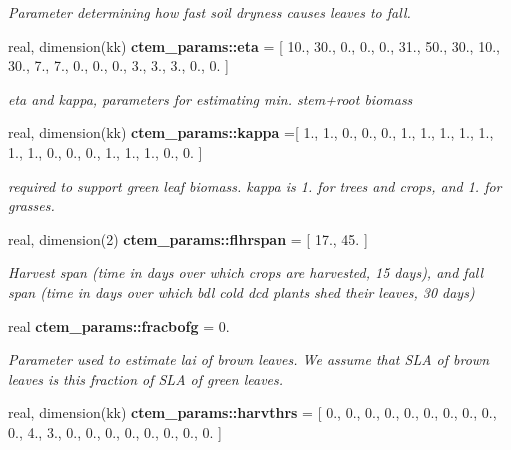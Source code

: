 \begin{DoxyCompactItemize}
\begin{DoxyCompactList}\small\item\em Parameter determining how fast soil dryness causes leaves to fall. \end{DoxyCompactList}\item 
\hypertarget{namespacectem__params_af316f76bee6244c68e937ed9e399bbd0}{}real, dimension(kk) {\bfseries ctem\+\_\+params\+::eta} = \mbox{[} 10., 30., 0., 0., 0., 31., 50., 30., 10., 30., 7., 7., 0., 0., 0., 3., 3., 3., 0., 0. \mbox{]}\label{namespacectem__params_af316f76bee6244c68e937ed9e399bbd0}

\begin{DoxyCompactList}\small\item\em eta and kappa, parameters for estimating min. stem+root biomass \end{DoxyCompactList}\item 
\hypertarget{namespacectem__params_a31cd33c14ab64d6e347e8fa8649c0ac8}{}real, dimension(kk) {\bfseries ctem\+\_\+params\+::kappa} =\mbox{[} 1., 1., 0., 0., 0., 1., 1., 1., 1., 1., 1., 1., 0., 0., 0., 1., 1., 1., 0., 0. \mbox{]}\label{namespacectem__params_a31cd33c14ab64d6e347e8fa8649c0ac8}

\begin{DoxyCompactList}\small\item\em required to support green leaf biomass. kappa is 1. for trees and crops, and 1. for grasses. \end{DoxyCompactList}\item 
\hypertarget{namespacectem__params_a766b351a6a0cf14bfa75068e43a300da}{}real, dimension(2) {\bfseries ctem\+\_\+params\+::flhrspan} = \mbox{[} 17., 45. \mbox{]}\label{namespacectem__params_a766b351a6a0cf14bfa75068e43a300da}

\begin{DoxyCompactList}\small\item\em Harvest span (time in days over which crops are harvested, 15 days), and fall span (time in days over which bdl cold dcd plants shed their leaves, 30 days) \end{DoxyCompactList}\item 
\hypertarget{namespacectem__params_a220bfc3b9a9be5d41edb3eda82a2988e}{}real {\bfseries ctem\+\_\+params\+::fracbofg} = 0.\label{namespacectem__params_a220bfc3b9a9be5d41edb3eda82a2988e}

\begin{DoxyCompactList}\small\item\em Parameter used to estimate lai of brown leaves. We assume that S\+L\+A of brown leaves is this fraction of S\+L\+A of green leaves. \end{DoxyCompactList}\item 
\hypertarget{namespacectem__params_a3692335bc09fe9876e4054a0658982ff}{}real, dimension(kk) {\bfseries ctem\+\_\+params\+::harvthrs} = \mbox{[} 0., 0., 0., 0., 0., 0., 0., 0., 0., 0., 4., 3., 0., 0., 0., 0., 0., 0., 0., 0. \mbox{]}\label{namespacectem__params_a3692335bc09fe9876e4054a0658982ff}


\end{DoxyCompactItemize}
